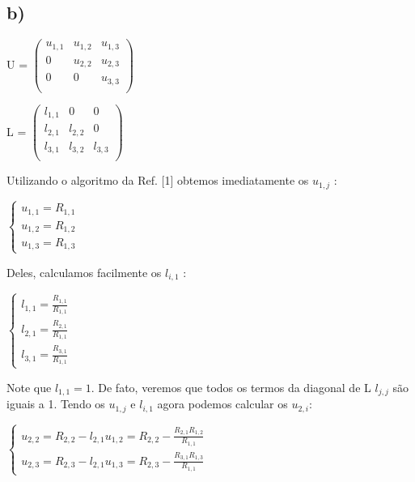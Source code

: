 \documentclass[a4wide]{report}
\begin{document}
\subsection*{b)}



U = 
 $\begin{pmatrix}
  u_{1,1}  & u_{1,2}	&	u_{1,3} \\
  0  & u_{2,2}	&	u_{2,3} \\
  0  & 0	&	u_{3,3} \\
 \end{pmatrix}$
 						
 \vspace{1em}
 
L = 
 $\begin{pmatrix}
  l_{1,1}  & 0	&	0 \\
  l_{2,1}  & l_{2,2}	&	0 \\
  l_{3,1}  & l_{3,2}	&	l_{3,3} \\
\end{pmatrix}$
 \vspace{1em}
 
Utilizando o algoritmo da Ref. [1] obtemos imediatamente os $u_{1,j}$ :

$\begin{cases} 
u_{1,1} = R_{1,1} \\ 
u_{1,2} = R_{1,2} \\  
u_{1,3} = R_{1,3}
\end{cases} $
 \vspace{1em}  
 
Deles, calculamos facilmente os $l_{i,1}$ :

$\begin{cases} 
l_{1,1} = \frac{R_{1,1}}{R_{1,1}} \\ 
l_{2,1} = \frac{R_{2,1}}{R_{1,1}} \\  
l_{3,1} = \frac{R_{3,1}}{R_{1,1}}
\end{cases} $
 \vspace{1em}
 
Note que $l_{1,1} = 1$. De fato, veremos que todos os termos da diagonal de L $l_{j,j}$ são iguais a 1. Tendo os $u_{1,j}$ e $l_{i,1}$ agora podemos calcular os $u_{2,i}$:

$\begin{cases} 
u_{2,2} = R_{2,2} - l_{2,1}u_{1,2} = R_{2,2} - \frac{R_{2,1} R_{1,2}}{R_{1,1} }  \\  
u_{2,3} = R_{2,3} - l_{2,1}u_{1,3} = R_{2,3} - \frac{R_{3,1} R_{1,3}}{R_{1,1} } 
\end{cases} $
 \vspace{1em}
 
\end{document}
